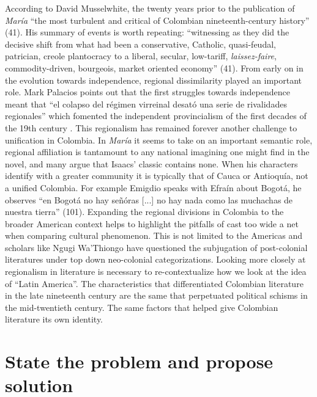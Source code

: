 According to David Musselwhite, the twenty years prior to the publication of \textit{María} \enquote{the most turbulent and critical of Colombian nineteenth-century history} \nocite{Musselwhite2006}(41). His summary of events is worth repeating: \enquote{witnessing as they did the decisive shift from what had been a conservative, Catholic, quasi-feudal, patrician, creole plantocracy to a liberal, secular, low-tariff, \textit{laissez-faire}, commodity-driven, bourgeois, market oriented economy} \nocite{Musselwhite2006}(41). From early on in the evolution towards independence, regional dissimilarity played an important role. Mark Palacios points out that the first struggles towards independence meant that \enquote{el colapso del régimen virreinal desató una serie de rivalidades regionales} which fomented the independent provincialism of the first decades of the 19th century \autocite[205]{Palacios2002}. This regionalism has remained forever another challenge to unification in Colombia. In \textit{María} it seems to take on an important semantic role, regional affiliation is tantamount to any national imagining one might find in the novel, and many argue that Isaacs' classic contains none. When his characters identify with a greater community it is typically that of Cauca or Antioquía, not a unified Colombia. For example Emigdio speaks with Efraín about Bogotá, he observes \enquote{en Bogotá no hay señóras [...] no hay nada como las muchachas de nuestra tierra} (101). Expanding the regional divisions in Colombia to the broader American context helps to highlight the pitfalls of cast too wide a net when comparing cultural phenomenon. This is not limited to the Americas and scholars like Ngugi Wa’Thiongo have questioned the subjugation of post-colonial literatures under top down neo-colonial categorizations.
Looking more closely at regionalism in literature is necessary to re-contextualize how we look at the idea of \enquote{Latin America}. 
The characteristics that differentiated Colombian literature in the late nineteenth century are the same that perpetuated political schisms in the mid-twentieth century. The same factors that helped give Colombian literature its own identity. 


\section{State the problem and propose solution}


